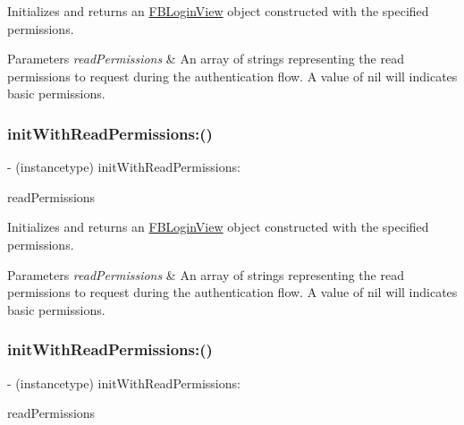 Initializes and returns an {\ttfamily \hyperlink{interfaceFBLoginView}{F\+B\+Login\+View}} object constructed with the specified permissions.


\begin{DoxyParams}{Parameters}
{\em read\+Permissions} & An array of strings representing the read permissions to request during the authentication flow. A value of nil will indicates basic permissions. \\
\hline
\end{DoxyParams}
\mbox{\label{interfaceFBLoginView_a1a7bc3cf0ef2b11b1d3c7b6567ad937f}} 
\subsubsection{\texorpdfstring{init\+With\+Read\+Permissions\+:()}{initWithReadPermissions:()}\hspace{0.1cm}{\footnotesize\ttfamily [4/5]}}
{\footnotesize\ttfamily -\/ (instancetype) init\+With\+Read\+Permissions\+: \begin{DoxyParamCaption}\item[{(N\+S\+Array $\ast$)}]{read\+Permissions }\end{DoxyParamCaption}}

Initializes and returns an {\ttfamily \hyperlink{interfaceFBLoginView}{F\+B\+Login\+View}} object constructed with the specified permissions.


\begin{DoxyParams}{Parameters}
{\em read\+Permissions} & An array of strings representing the read permissions to request during the authentication flow. A value of nil will indicates basic permissions. \\
\hline
\end{DoxyParams}
\mbox{\label{interfaceFBLoginView_a1a7bc3cf0ef2b11b1d3c7b6567ad937f}} 
\subsubsection{\texorpdfstring{init\+With\+Read\+Permissions\+:()}{initWithReadPermissions:()}\hspace{0.1cm}{\footnotesize\ttfamily [5/5]}}
{\footnotesize\ttfamily -\/ (instancetype) init\+With\+Read\+Permissions\+: \begin{DoxyParamCaption}\item[{(N\+S\+Array $\ast$)}]{read\+Permissions }\end{DoxyParamCaption}}

